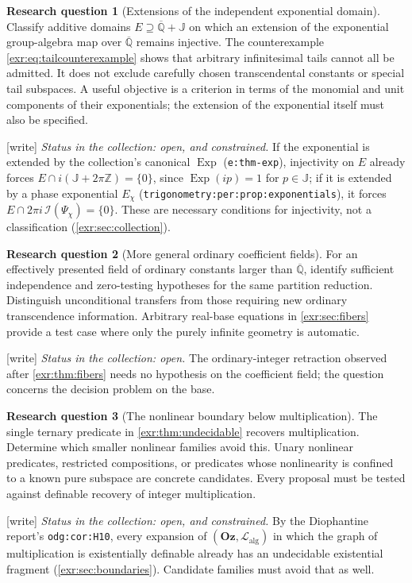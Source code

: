 \documentclass[11pt,letterpaper]{article}
\numberwithin{equation}{section}
\theoremstyle{definition}
\newtheorem{question}{Research question}
\theoremstyle{remark}
\newcommand{\Oz}{\mathbf{Oz}}
\newcommand{\Z}{\mathbb Z}
\newcommand{\Qb}{\overline{\mathbb Q}}
\newcommand{\J}{\mathbb J}
\newcommand{\Lalg}{\mathcal L_{\mathrm{alg}}}
\newcommand{\Exp}{\operatorname{Exp}}
\newcommand{\lbl}[1]{\nolinkurl{#1}}%
\newcommand{\wtag}{\textup{[write]}}%
\begin{document}
\begin{question}[Extensions of the independent exponential domain]\label{exr:q:extension}
Classify additive domains $E\supseteq\Qb+\J$ on which an extension of the
exponential group-algebra map over $\Qb$ remains injective. The counterexample
\eqref{exr:eq:tailcounterexample} shows that arbitrary infinitesimal tails cannot all
be admitted. It does not exclude carefully chosen transcendental constants or
special tail subspaces. A useful objective is a criterion in terms of the
monomial and unit components of their exponentials; the extension of the
exponential itself must also be specified.
\end{question}
\wtag{} \emph{Status in the collection: open, and constrained.} If the
exponential is extended by the collection's canonical $\Exp$
(\lbl{e:thm-exp}), injectivity on $E$ already forces
$E\cap i(\J+2\pi\Z)=\{0\}$, since $\Exp(ip)=1$ for $p\in\J$; if it is
extended by a phase exponential $E_\chi$
(\lbl{trigonometry:per:prop:exponentials}), it forces
$E\cap2\pi i\,\mathcal I(\Psi_\chi)=\{0\}$. These are necessary conditions for
injectivity, not a classification (\cref{exr:sec:collection}).


\begin{question}[More general ordinary coefficient fields]\label{exr:q:coefficients}
For an effectively presented field of ordinary constants larger than $\Qb$,
identify sufficient independence and zero-testing hypotheses for the same
partition reduction. Distinguish unconditional transfers from those requiring
new ordinary transcendence information. Arbitrary real-base equations in
\cref{exr:sec:fibers} provide a test case where only the purely infinite geometry is
automatic.
\end{question}
\wtag{} \emph{Status in the collection: open.} The ordinary-integer
retraction observed after \cref{exr:thm:fibers} needs no hypothesis on the
coefficient field; the question concerns the decision problem on the base.


\begin{question}[The nonlinear boundary below multiplication]\label{exr:q:nonlinear}
The single ternary predicate in \cref{exr:thm:undecidable} recovers multiplication.
Determine which smaller nonlinear families avoid this. Unary nonlinear predicates,
restricted compositions, or predicates whose nonlinearity is confined to a known
pure subspace are concrete candidates. Every proposal must be tested against
definable recovery of integer multiplication.
\end{question}
\wtag{} \emph{Status in the collection: open, and constrained.} By the
Diophantine report's \lbl{odg:cor:H10}, every expansion of $(\Oz,\Lalg)$ in
which the graph of multiplication is existentially definable already has an
undecidable existential fragment (\cref{exr:sec:boundaries}). Candidate
families must avoid that as well.
\end{document}
